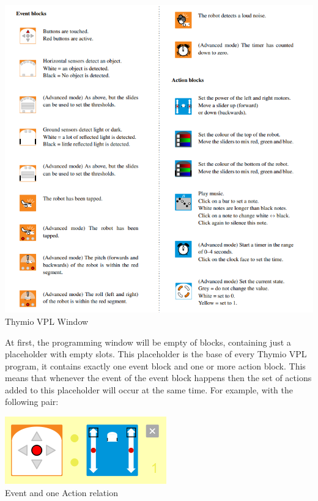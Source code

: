 \documentclass{scrartcl}
\begin{document}
\begin{center}
  \includegraphics[width=\textwidth]{./VPL/Thymio_blocks}
  Thymio VPL Window
\end{center}

At first, the programming window will be empty of blocks, containing just a placeholder with empty slots. 
This placeholder is the base of every Thymio VPL program, it contains exactly one event block and one or more action block. 
This means that whenever the event of the event block happens then the set of actions added to this placeholder will occur at the same time. 
For example, with the following pair: \\
\begin{center}
  \includegraphics[scale=0.5]{./VPL/middlebtn_forward}\\
  Event and one Action relation
\end{center}
\end{document}
